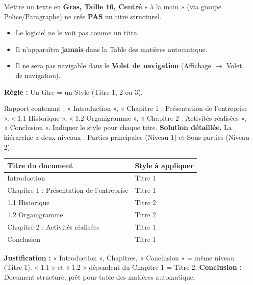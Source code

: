 \documentclass[11pt]{article}
\begin{document}
\begin{attention}
Mettre un texte en \textbf{Gras, Taille 16, Centré} « à la main » (via groupe Police/Paragraphe) ne crée \textbf{PAS} un titre structurel.
\begin{itemize}
  \item Le logiciel ne le voit pas comme un titre.
  \item Il n'apparaîtra \textbf{jamais} dans la Table des matières automatique.
  \item Il ne sera pas navigable dans le \textbf{Volet de navigation} (Affichage $\rightarrow$ Volet de navigation).
\end{itemize}
\textbf{Règle :} Un titre = un Style (Titre 1, 2 ou 3).
\end{attention}

\begin{exoresolu}
Rapport contenant : « Introduction », « Chapitre 1 : Présentation de l'entreprise », « 1.1 Historique », « 1.2 Organigramme », « Chapitre 2 : Activités réalisées », « Conclusion ». Indiquer le style pour chaque titre.
\tcblower
\textbf{Solution détaillée.}
La hiérarchie a deux niveaux : Parties principales (Niveau 1) et Sous-parties (Niveau 2).
\begin{center}
\begin{tabularx}{\linewidth}{|l|X|}\hline
\rowcolor{popblueL} \textbf{Titre du document} & \textbf{Style à appliquer} \\\hline
Introduction & Titre 1 \\\hline
Chapitre 1 : Présentation de l'entreprise & Titre 1 \\\hline
1.1 Historique & Titre 2 \\\hline
1.2 Organigramme & Titre 2 \\\hline
Chapitre 2 : Activités réalisées & Titre 1 \\\hline
Conclusion & Titre 1 \\\hline
\end{tabularx}
\end{center}
\textbf{Justification :} « Introduction », Chapitres, « Conclusion » = même niveau (Titre 1). « 1.1 » et « 1.2 » dépendent du Chapitre 1 = Titre 2.
\textbf{Conclusion :} Document structuré, prêt pour table des matières automatique.
\end{exoresolu}
\end{document}
